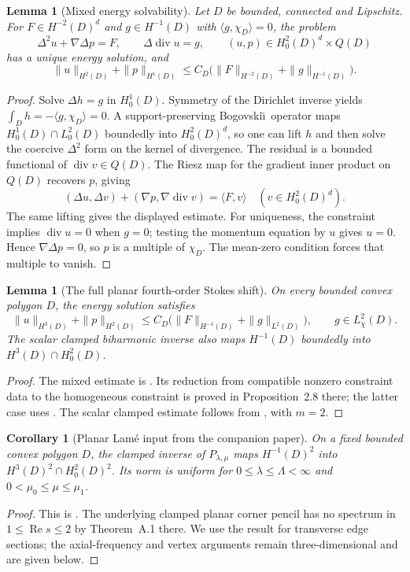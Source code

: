 \documentclass[11pt,a4paper]{article}
\newtheorem{lemma}[theorem]{Lemma}
\newtheorem{corollary}[theorem]{Corollary}
\theoremstyle{remark}
\numberwithin{equation}{section}
\begin{document}
\begin{lemma}[Mixed energy solvability]\label{lem:g-energy}
Let $D$ be bounded, connected and Lipschitz. For $F\in H^{-2}(D)^d$ and
$g\in H^{-1}(D)$ with $\langle g,\chi_D\rangle=0$, the problem
\[
 \Delta^2u+\nabla\Delta p=F,\qquad
 \Delta\operatorname{div}u=g,
 \qquad (u,p)\in H^2_0(D)^d\times Q(D)
\]
has a unique energy solution, and
\[
 \|u\|_{H^2(D)}+\|p\|_{H^1(D)}
 \le C_D\bigl(\|F\|_{H^{-2}(D)}+\|g\|_{H^{-1}(D)}\bigr).
\]
\end{lemma}
\begin{proof}
Solve $\Delta h=g$ in $H^1_0(D)$. Symmetry of the Dirichlet inverse yields
$\int_D h=-\langle g,\chi_D\rangle=0$. A support-preserving Bogovski\u\i\
operator maps $H^1_0(D)\cap L^2_0(D)$ boundedly into $H^2_0(D)^d$, so one can
lift $h$ and then solve the coercive $\Delta^2$ form on the kernel of
divergence. The residual is a bounded functional of
$\operatorname{div}v\in Q(D)$. The Riesz map for the gradient inner product
on $Q(D)$ recovers $p$, giving
\[
 (\Delta u,\Delta v)+(\nabla p,\nabla\operatorname{div}v)
 =\langle F,v\rangle\quad(v\in H^2_0(D)^d).
\]
The same lifting gives the displayed estimate. For uniqueness, the constraint
implies $\operatorname{div}u=0$ when $g=0$; testing the momentum equation by
$u$ gives $u=0$. Hence $\nabla\Delta p=0$, so $p$ is a multiple of
$\chi_D$. The mean-zero condition forces that multiple to vanish.
\end{proof}

\begin{lemma}[The full planar fourth-order Stokes shift]\label{lem:g-planarstokes}
On every bounded convex polygon $D$, the energy solution satisfies
\[
 \|u\|_{H^3(D)}+\|p\|_{H^2(D)}
 \le C_D\bigl(\|F\|_{H^{-1}(D)}+\|g\|_{L^2(D)}\bigr),
 \qquad g\in L^2_\chi(D).
\]
The scalar clamped biharmonic inverse also maps $H^{-1}(D)$ boundedly into
$H^3(D)\cap H^2_0(D)$.
\end{lemma}
\begin{proof}
The mixed estimate is \cite[Proposition~2.9]{PolygonCompanion2026}.
Its reduction from compatible nonzero constraint data to the homogeneous
constraint is proved in Proposition~2.8 there; the latter case uses
\cite[Theorem~3.6]{ChenHuangHuang2023}. The scalar clamped estimate follows from
\cite[Theorem~3.3 and Lemma~3.4]{ChenHuangHuang2023}, with \(m=2\).
\end{proof}

\begin{corollary}[Planar Lam\'e input from the companion paper]
\label{cor:planar-H320}
On a fixed bounded convex polygon \(D\), the clamped inverse of
\(P_{\lambda,\mu}\) maps \(H^{-1}(D)^2\) into
\(H^3(D)^2\cap H^2_0(D)^2\). Its norm is uniform for
\(0\le\lambda\le\Lambda<\infty\) and
\(0<\mu_0\le\mu\le\mu_1\).
\end{corollary}
\begin{proof}
This is \cite[Proposition~2.6]{PolygonCompanion2026}. The underlying
clamped planar corner pencil has no spectrum in
\(1\le\operatorname{Re}s\le2\) by Theorem~A.1 there. We use the
result for transverse edge sections; the axial-frequency and vertex
arguments remain three-dimensional and are given below.
\end{proof}
\end{document}
